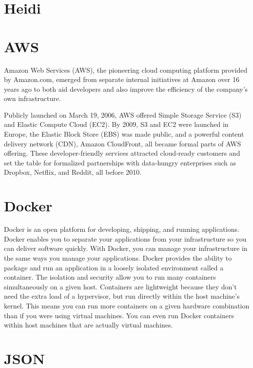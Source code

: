 \section {Heidi}
\newline

\section {AWS}
Amazon Web Services (AWS), the pioneering cloud computing platform provided by Amazon.com, emerged from separate internal initiatives at Amazon over 16 years ago to both aid developers and also improve the efficiency of the company’s own infrastructure.\newline

Publicly launched on March 19, 2006, AWS offered Simple Storage Service (S3) and Elastic Compute Cloud (EC2). By 2009, S3 and EC2 were launched in Europe, the Elastic Block Store (EBS) was made public, and a powerful content delivery network (CDN), Amazon CloudFront, all became formal parts of AWS offering. These developer-friendly services attracted cloud-ready customers and set the table for formalized partnerships with data-hungry enterprises such as Dropbox, Netflix, and Reddit, all before 2010.\newline

\section {Docker}
Docker is an open platform for developing, shipping, and running applications. Docker enables you to separate your applications from your infrastructure so you can deliver software quickly. With Docker, you can manage your infrastructure in the same ways you manage your applications. Docker provides the ability to package and run an application in a loosely isolated environment called a container. The isolation and security allow you to run many containers simultaneously on a given host. Containers are lightweight because they don’t need the extra load of a hypervisor, but run directly within the host machine’s kernel. This means you can run more containers on a given hardware combination than if you were using virtual machines. You can even run Docker containers within host machines that are actually virtual machines.

\section {JSON}
\newline



